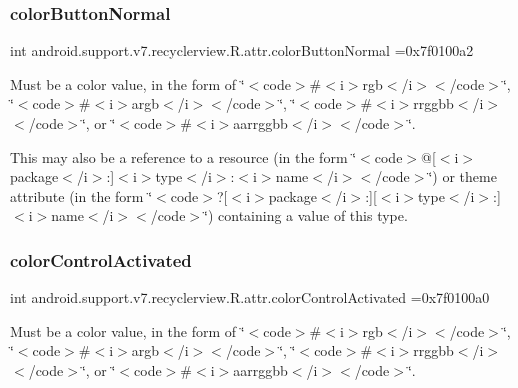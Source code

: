 \subsubsection{\texorpdfstring{color\+Button\+Normal}{colorButtonNormal}}
{\footnotesize\ttfamily int android.\+support.\+v7.\+recyclerview.\+R.\+attr.\+color\+Button\+Normal =0x7f0100a2\hspace{0.3cm}{\ttfamily [static]}}

Must be a color value, in the form of \char`\"{}$<$code$>$\#$<$i$>$rgb$<$/i$>$$<$/code$>$\char`\"{}, \char`\"{}$<$code$>$\#$<$i$>$argb$<$/i$>$$<$/code$>$\char`\"{}, \char`\"{}$<$code$>$\#$<$i$>$rrggbb$<$/i$>$$<$/code$>$\char`\"{}, or \char`\"{}$<$code$>$\#$<$i$>$aarrggbb$<$/i$>$$<$/code$>$\char`\"{}. 

This may also be a reference to a resource (in the form \char`\"{}$<$code$>$@\mbox{[}$<$i$>$package$<$/i$>$\+:\mbox{]}$<$i$>$type$<$/i$>$\+:$<$i$>$name$<$/i$>$$<$/code$>$\char`\"{}) or theme attribute (in the form \char`\"{}$<$code$>$?\mbox{[}$<$i$>$package$<$/i$>$\+:\mbox{]}\mbox{[}$<$i$>$type$<$/i$>$\+:\mbox{]}$<$i$>$name$<$/i$>$$<$/code$>$\char`\"{}) containing a value of this type. \mbox{\label{classandroid_1_1support_1_1v7_1_1recyclerview_1_1R_1_1attr_ac25a683b74348a5ebcfaca1be8c0cbb4}} 
\subsubsection{\texorpdfstring{color\+Control\+Activated}{colorControlActivated}}
{\footnotesize\ttfamily int android.\+support.\+v7.\+recyclerview.\+R.\+attr.\+color\+Control\+Activated =0x7f0100a0\hspace{0.3cm}{\ttfamily [static]}}

Must be a color value, in the form of \char`\"{}$<$code$>$\#$<$i$>$rgb$<$/i$>$$<$/code$>$\char`\"{}, \char`\"{}$<$code$>$\#$<$i$>$argb$<$/i$>$$<$/code$>$\char`\"{}, \char`\"{}$<$code$>$\#$<$i$>$rrggbb$<$/i$>$$<$/code$>$\char`\"{}, or \char`\"{}$<$code$>$\#$<$i$>$aarrggbb$<$/i$>$$<$/code$>$\char`\"{}. 

